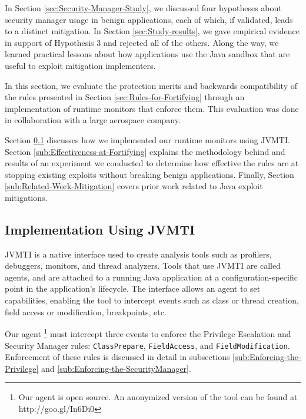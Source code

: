 \documentclass{sig-alternate}
\begin{document}
In Section \ref{sec:Security-Manager-Study}, we discussed four hypotheses about security manager usage in benign applications, each
of which, if validated, leads to a distinct mitigation. In Section
\ref{sec:Study-results}, we gave empirical evidence in support of
Hypothesis 3 and rejected all of the others. Along the way, we learned
practical lessons about how applications use the Java sandbox that
are useful to exploit mitigation implementers. 

In this section, we evaluate the protection merits and backwards compatibility of the rules presented in Section \ref{sec:Rules-for-Fortifying} through an implementation of runtime monitors that enforce them. This evaluation was done in collaboration
with a large aerospace company.

Section \ref{sub:Implementation-Using-JVMTI} discusses how we implemented
our runtime monitors using JVMTI. Section \ref{sub:Effectiveness-at-Fortifying}
explains the methodology behind and results of an experiment we conducted
to determine how effective the rules are at stopping existing exploits without breaking benign applications. Finally, Section
\ref{sub:Related-Work-Mitigation} covers prior work related to Java exploit mitigations.

\subsection{Implementation Using JVMTI}\label{sub:Implementation-Using-JVMTI}

JVMTI is a native interface used to create
analysis tools such as profilers, debuggers, monitors, and thread
analyzers. Tools that use JVMTI are called agents, and are attached
to a running Java application at a configuration-specific point in
the application's lifecycle. The interface allows an agent to set
capabilities, enabling the tool to intercept events such as class
or thread creation, field access or modification, breakpoints, etc.

Our agent \footnote{Our agent is open source. An anonymized version
of the tool can be found at http://goo.gl/In6Di0} must intercept three events to enforce the Privilege Escalation
and Security Manager rules: \texttt{ClassPrepare}, \texttt{FieldAccess},
and \texttt{FieldModification}. Enforcement of these rules is discussed
in detail in subsections \ref{sub:Enforcing-the-Privilege} and \ref{sub:Enforcing-the-SecurityManager}.
\end{document}
